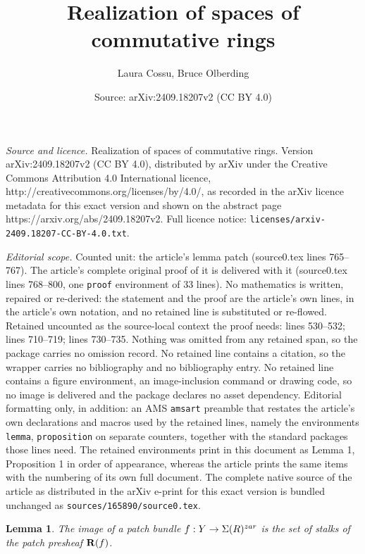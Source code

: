 \documentclass[10pt,a4paper]{amsart}
\title{Realization of spaces of commutative rings}
\author{Laura Cossu, Bruce Olberding}
\date{Source: arXiv:2409.18207v2 (CC BY 4.0)}
\newtheorem{lemma}{Lemma}
\begin{document}
\maketitle

\noindent\emph{Source and licence.} Realization of spaces of commutative rings. Version arXiv:2409.18207v2 (CC BY 4.0), distributed by arXiv under the Creative Commons Attribution 4.0 International licence, http://creativecommons.org/licenses/by/4.0/, as recorded in the arXiv licence metadata for this exact version and shown on the abstract page https://arxiv.org/abs/2409.18207v2. Full licence notice: \texttt{licenses/arxiv-2409.18207-CC-BY-4.0.txt}.\par\smallskip

\noindent\textit{Editorial scope.} Counted unit: the article's lemma patch (source0.tex lines 765--767). The article's complete original proof of it is delivered with it (source0.tex lines 768--800, one \texttt{proof} environment of 33 lines). No mathematics is written, repaired or re-derived: the statement and the proof are the article's own lines, in the article's own notation, and no retained line is substituted or re-flowed.  Retained uncounted as the source-local context the proof needs: lines 530--532; lines 710--719; lines 730--735.  Nothing was omitted from any retained span, so the package carries no omission record.  No retained line contains a citation, so the wrapper carries no bibliography and no bibliography entry.  No retained line contains a figure environment, an image-inclusion command or drawing code, so no image is delivered and the package declares no asset dependency.  Editorial formatting only, in addition: an AMS \texttt{amsart} preamble that restates the article's own declarations and macros used by the retained lines, namely the environments \texttt{lemma}, \texttt{proposition} on separate counters, together with the standard packages those lines need.  The retained environments print in this document as Lemma 1, Proposition 1 in order of appearance, whereas the article prints the same items with the numbering of its own full document.  The complete native source of the article as distributed in the arXiv e-print for this exact version is bundled unchanged as \texttt{sources/165890/source0.tex}.
\begin{lemma} \label{lem: bundle and stalks}
The image of a patch bundle $f:Y \rightarrow \Sigma(R)^{\rm zar}$  is the set of stalks of the patch presheaf ${\bf R}(f)$.    
\end{lemma} 
\end{document}
